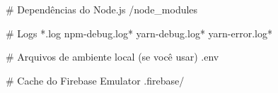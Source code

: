 # Dependências do Node.js
/node_modules

# Logs
*.log
npm-debug.log*
yarn-debug.log*
yarn-error.log*

# Arquivos de ambiente local (se você usar)
.env

# Cache do Firebase Emulator
.firebase/